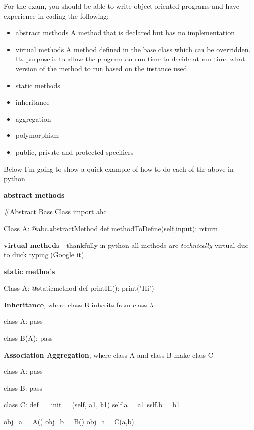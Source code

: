   	For the exam, you should be able to write object oriented programs and have experience in coding the following:
  	\begin{itemize}
  		\item abstract methods
	  		\subitem A method that is declared but has no implementation
  		\item virtual methods
	  		\subitem A method defined in the base class which can be overridden. Its purpose is to allow the program on run time to decide at run-time what version of the method to run based on the instance used.
  		\item static methods
  		\item inheritance
  		\item aggregation
  		\item polymorphism
  		\item public, private and protected specifiers
  	\end{itemize}
  	
  	Below I'm going to show a quick example of how to do each of the above in python
  	
  	\textbf{abstract methods}
  	
  	\begin{python}
#Abstract Base Class
import abc

Class A:
	@abc.abstractMethod
	def methodToDefine(self,input):
		return\end{python}
	
	\textbf{virtual methods} - thankfully in python all methods are \textit{technically} virtual due to duck typing (Google it).
	
	\textbf{static methods}
	
\begin{python}
Class A:
	@staticmethod
	def printHi():
  		print("Hi")\end{python}	
  	
  	\textbf{Inheritance}, where class B inherits from class A
  	
\begin{python}
class A:
	pass

class B(A):
	pass
\end{python}
	
	\textbf{Association Aggregation}, where class A and class B make class C

\begin{python}
class A:
	pass

class B:
	pass

class C:
	def __init__(self, a1, b1)
		self.a = a1
		self.b = b1
		
obj_a = A()
obj_b = B()
obj_c = C(a,b)
\end{python}

